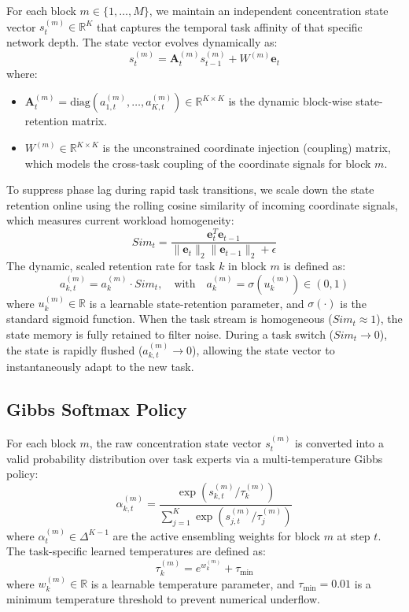 For each block $m \in \{1, \dots, M\}$, we maintain an independent concentration state vector $s^{(m)}_t \in \mathbb{R}^K$ that captures the temporal task affinity of that specific network depth. The state vector evolves dynamically as:
\begin{equation}
    s^{(m)}_t = \mathbf{A}^{(m)}_t s^{(m)}_{t-1} + W^{(m)} \mathbf{e}_t
\end{equation}
where:
\begin{itemize}
    \item $\mathbf{A}^{(m)}_t = \text{diag}(a^{(m)}_{1, t}, \dots, a^{(m)}_{K, t}) \in \mathbb{R}^{K \times K}$ is the dynamic block-wise state-retention matrix.
    \item $W^{(m)} \in \mathbb{R}^{K \times K}$ is the unconstrained coordinate injection (coupling) matrix, which models the cross-task coupling of the coordinate signals for block $m$.
\end{itemize}

To suppress phase lag during rapid task transitions, we scale down the state retention online using the rolling cosine similarity of incoming coordinate signals, which measures current workload homogeneity:
\begin{equation}
    Sim_t = \frac{\mathbf{e}_t^T \mathbf{e}_{t-1}}{\|\mathbf{e}_t\|_2 \|\mathbf{e}_{t-1}\|_2 + \epsilon}
\end{equation}
The dynamic, scaled retention rate for task $k$ in block $m$ is defined as:
\begin{equation}
    a^{(m)}_{k, t} = a^{(m)}_k \cdot Sim_t, \quad \text{with} \quad a^{(m)}_k = \sigma(u^{(m)}_k) \in (0, 1)
\end{equation}
where $u^{(m)}_k \in \mathbb{R}$ is a learnable state-retention parameter, and $\sigma(\cdot)$ is the standard sigmoid function. When the task stream is homogeneous ($Sim_t \approx 1$), the state memory is fully retained to filter noise. During a task switch ($Sim_t \to 0$), the state is rapidly flushed ($a^{(m)}_{k, t} \to 0$), allowing the state vector to instantaneously adapt to the new task.

\subsection{Gibbs Softmax Policy}
For each block $m$, the raw concentration state vector $s^{(m)}_t$ is converted into a valid probability distribution over task experts via a multi-temperature Gibbs policy:
\begin{equation}
    \alpha^{(m)}_{k, t} = \frac{\exp\left(s^{(m)}_{k, t} / \tau^{(m)}_k \right)}{\sum_{j=1}^K \exp\left(s^{(m)}_{j, t} / \tau^{(m)}_j \right)}
\end{equation}
where $\alpha^{(m)}_t \in \Delta^{K-1}$ are the active ensembling weights for block $m$ at step $t$. The task-specific learned temperatures are defined as:
\begin{equation}
    \tau^{(m)}_k = e^{w^{(m)}_k} + \tau_{\min}
\end{equation}
where $w^{(m)}_k \in \mathbb{R}$ is a learnable temperature parameter, and $\tau_{\min} = 0.01$ is a minimum temperature threshold to prevent numerical underflow.

